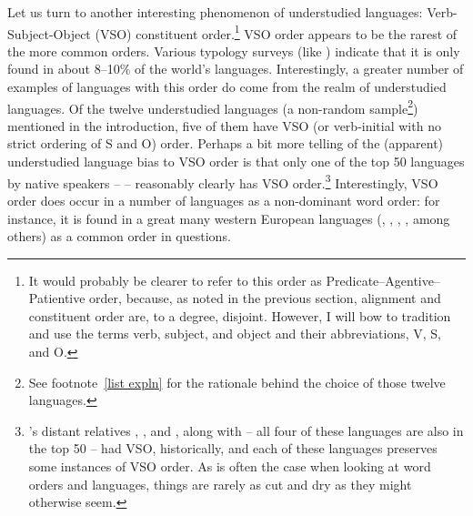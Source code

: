 \documentclass[output=paper
 	        ,biblatex
                ,babelshorthands
                ,newtxmath
                ,draftmode
                ,colorlinks, citecolor=brown
]{langscibook}
\begin{document}
Let us turn to another interesting phenomenon of understudied languages: Verb-Subject-Object (VSO) constituent order.\footnote{It would probably be clearer to refer to this order as Predicate--Agentive--Patientive order, because, as noted in the previous section, alignment and constituent order are, to a degree, disjoint. However, I will bow to tradition and use the terms verb, subject, and object and their abbreviations, V, S, and O.} VSO order appears to be the rarest of the more common orders. Various typology surveys (like \citealt{dryerWALSwordorder}) indicate that it is only found in about 8--10\% of the world's languages. Interestingly, a greater number of examples of languages with this order do come from the realm of understudied languages. Of the twelve understudied languages (a non-random sample\footnote{See footnote~\ref{list expln} for the rationale behind the choice of those twelve languages.}) mentioned in the introduction, five of them have VSO (or verb-initial with no strict ordering of S and O) order. Perhaps a bit more telling of the (apparent) understudied language bias to VSO order is that only one of the top 50 languages by native speakers --  -- reasonably clearly has VSO order.\footnote{'s distant  relatives , , and , along with  -- all four of these languages are also in the top 50 -- had VSO, historically, and each of these languages preserves some instances of VSO order. As is often the case when looking at word orders and languages, things are rarely as cut and dry as they might otherwise seem.} Interestingly, VSO order does occur in a number of languages as a non-dominant word order: for instance, it is found in a great many western European languages (, , , , among others) as a common order in questions.
\end{document}
